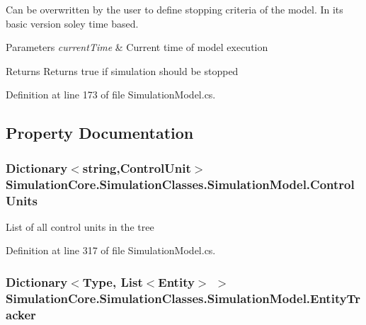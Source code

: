 Can be overwritten by the user to define stopping criteria of the model. In its basic version soley time based. 


\begin{DoxyParams}{Parameters}
{\em current\+Time} & Current time of model execution\\
\hline
\end{DoxyParams}
\begin{DoxyReturn}{Returns}
Returns true if simulation should be stopped
\end{DoxyReturn}


Definition at line 173 of file Simulation\+Model.\+cs.



\subsection{Property Documentation}
\subsubsection[{\texorpdfstring{Control\+Units}{ControlUnits}}]{\setlength{\rightskip}{0pt plus 5cm}Dictionary$<$string,{\bf Control\+Unit}$>$ Simulation\+Core.\+Simulation\+Classes.\+Simulation\+Model.\+Control\+Units\hspace{0.3cm}{\ttfamily [get]}}\hypertarget{class_simulation_core_1_1_simulation_classes_1_1_simulation_model_aea904fcb233f91997093bb009eb48029}{}\label{class_simulation_core_1_1_simulation_classes_1_1_simulation_model_aea904fcb233f91997093bb009eb48029}


List of all control units in the tree 



Definition at line 317 of file Simulation\+Model.\+cs.

\subsubsection[{\texorpdfstring{Entity\+Tracker}{EntityTracker}}]{\setlength{\rightskip}{0pt plus 5cm}Dictionary$<$Type, List$<${\bf Entity}$>$ $>$ Simulation\+Core.\+Simulation\+Classes.\+Simulation\+Model.\+Entity\+Tracker\hspace{0.3cm}{\ttfamily [get]}}\hypertarget{class_simulation_core_1_1_simulation_classes_1_1_simulation_model_a0cde5d5c69bb03585275535f46990ee0}{}\label{class_simulation_core_1_1_simulation_classes_1_1_simulation_model_a0cde5d5c69bb03585275535f46990ee0}


